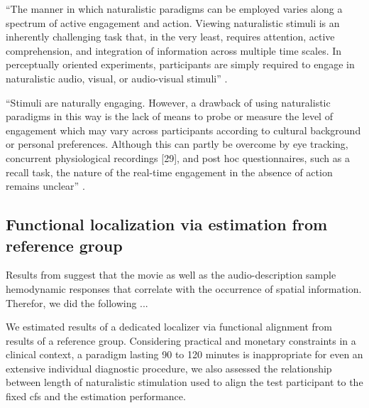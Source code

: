 


%
``The manner in which naturalistic paradigms can be employed varies along a
spectrum of active engagement and action.
%
Viewing naturalistic stimuli is an inherently challenging task that, in the very
least, requires attention, active comprehension, and integration of information
across multiple time scales.
%
In perceptually oriented experiments, participants are simply required to engage
in naturalistic audio, visual, or audio-visual stimuli''
\citep{sonkusare2019naturalistic}.

%
``Stimuli are naturally engaging.
%
However, a drawback of using naturalistic paradigms in this way is the lack of
means to probe or measure the level of engagement which may vary across
participants according to cultural background or personal preferences.
%
Although this can partly be overcome by eye tracking, concurrent physiological
recordings [29], and post hoc questionnaires, such as a recall task, the nature
of the real-time engagement in the absence of action remains unclear''
\citep{sonkusare2019naturalistic}.




\subsection{Functional localization via estimation from reference group}



%
Results from \citet{haeusler2022processing} suggest that the movie as well as
the audio-description sample hemodynamic responses that correlate with the
occurrence of spatial information.
%
Therefor, we did the following ...

We estimated results of a dedicated localizer \citep{sengupta2016extension} via
functional alignment from results of a reference group.
Considering practical and monetary constraints in a clinical context, a paradigm
lasting 90 to 120 minutes is inappropriate for even an extensive individual
diagnostic procedure, we also assessed the relationship between length of
naturalistic stimulation used to align the test participant to the fixed
\ac{cfs} and the estimation performance.



